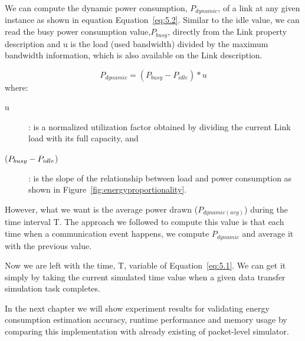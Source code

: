We can compute the dynamic power consumption, \(P_{dynamic}\), of a link at any given instance as shown in equation Equation~\ref{eq:5.2}. Similar to the idle value, we can read the busy power consumption value,\(P_{busy}\), directly from the 
Link property description and u is the load (used bandwidth) divided by the maximum bandwidth information, which is also available on the Link description. 

\begin{equation} \label{eq:5.2}
P_{dynamic} = (P_{busy} - P_{idle}) * u 
\end{equation} 
where:
\begin{description}
    \item [u]: is a normalized utilization factor obtained by dividing the current Link load with its full capacity, and 
    \item [(\($$P_{busy} - P_{idle}$$\))]: is the slope of the relationship between load and power consumption as shown in Figure~\ref{fig:energyproportionality}.
\end{description} 

However, what we want is the average power drawn (\(P_{dynamic (avg)}\))  during the time interval T.  The approach we followed to compute this value is that each time when a communication event happens, we compute \(P_{dynamic}\) and average it with the previous value. 

Now we are left with the time, T, variable of Equation~\ref{eq:5.1}. We can get it simply by taking the current simulated time value when a given data transfer simulation task completes.

In the next chapter we will show experiment results for validating energy consumption estimation accuracy, runtime performance and memory usage by comparing this implementation with already existing of packet-level simulator.
 

